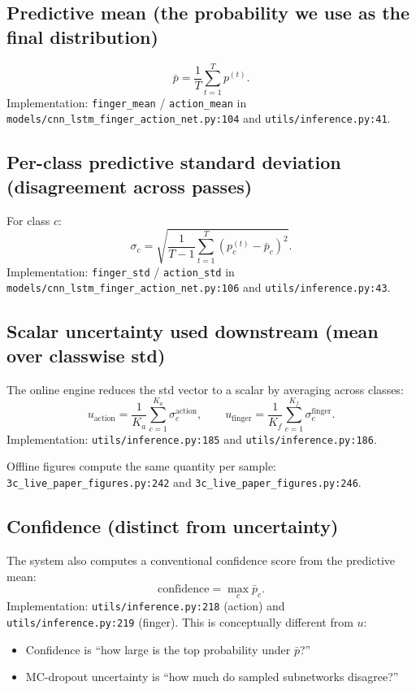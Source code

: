 \documentclass[11pt]{article}
\begin{document}
\subsection{Predictive mean (the probability we use as the final distribution)}
\[
\bar{p} = \frac{1}{T}\sum_{t=1}^T p^{(t)}.
\]
Implementation: \texttt{finger\_mean} / \texttt{action\_mean} in
\texttt{models/cnn\_lstm\_finger\_action\_net.py:104} and
\texttt{utils/inference.py:41}.

\subsection{Per-class predictive standard deviation (disagreement across passes)}
For class $c$:
\[
\sigma_c = \sqrt{\frac{1}{T-1}\sum_{t=1}^T \left(p^{(t)}_c - \bar{p}_c\right)^2}.
\]
Implementation: \texttt{finger\_std} / \texttt{action\_std} in
\texttt{models/cnn\_lstm\_finger\_action\_net.py:106} and
\texttt{utils/inference.py:43}.

\subsection{Scalar uncertainty used downstream (mean over classwise std)}
The online engine reduces the std vector to a scalar by averaging across classes:
\[
u_{\text{action}} = \frac{1}{K_a}\sum_{c=1}^{K_a}\sigma^{\text{action}}_c,\qquad
u_{\text{finger}} = \frac{1}{K_f}\sum_{c=1}^{K_f}\sigma^{\text{finger}}_c.
\]
Implementation:
\texttt{utils/inference.py:185} and \texttt{utils/inference.py:186}.

Offline figures compute the same quantity per sample:
\texttt{3c\_live\_paper\_figures.py:242} and \texttt{3c\_live\_paper\_figures.py:246}.

\subsection{Confidence (distinct from uncertainty)}
The system also computes a conventional confidence score from the predictive mean:
\[
\mathrm{confidence}=\max_c \bar{p}_c.
\]
Implementation: \texttt{utils/inference.py:218} (action) and \texttt{utils/inference.py:219} (finger).
This is conceptually different from $u$:
\begin{itemize}
  \item Confidence is ``how large is the top probability under $\bar{p}$?''
  \item MC-dropout uncertainty is ``how much do sampled subnetworks disagree?''
\end{itemize}
\end{document}
